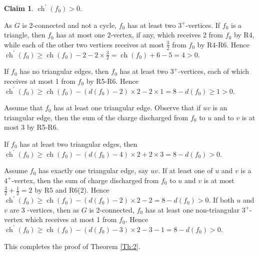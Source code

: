 \documentclass{article}
\newtheorem{claim}{Claim}
\begin{document}
\begin{claim}
    $\operatorname{ch}^{\prime}(f_0)>0$.
\end{claim}

As $G$ is 2-connected and not a cycle, $f_0$ has at least two $3^+$-vertices. If $f_0$ is a triangle, then $f_0$ has at most one $2$-vertex, if any, which receives 2 from $f_0$ by R4, while each of the other two vertices receives at most $\frac{3}{2}$ from $f_0$ by R4-R6. Hence  $\operatorname{ch}^{\prime}(f_0)\ge  \operatorname{ch}(f_0)-2 - 2\times\frac{3}{2}= \operatorname{ch}(f_0)+6 - 5 = 4>0$. 

 If $f_0$ has no triangular edges, then $f_0$ has at least two $3^+$-vertices, each of which receives at 
 most 1 from $f_0$ by R5-R6. Hence  $\operatorname{ch}^{\prime}(f_0)\ge  \operatorname{ch}(f_0)-(d(f_0)-2)\times 2 - 2\times 1=8 - d(f_0)\ge  1>0$. 
 
 Assume that $f_0$ has at least one triangular edge. Observe that if $uv$ is an triangular edge, then the sum of the charge discharged from $f_0$ to $u$ and to $v$ is at most 3 by R5-R6. 
 
 If $f_0$ has at least two triangular edges, then $\operatorname{ch}^{\prime}(f_0)\ge  \operatorname{ch}(f_0)-(d(f_0)-4 )\times 2+2\times 3=8 - d(f_0)>0$. 
 
 Assume $f_0$ has exactly one triangular edge, say $uv$. If at least one of $u$ and $v$ is a $4^+$-vertex, then the sum of charge discharged from $f_0$ to $u$ and $v$ is at most  $\frac{3}{2}+\frac{1}{2}=2$  by R5 and R6(2).
Hence $\operatorname{ch}^{\prime}\left(f_{0}\right) \geq \operatorname{ch}\left(f_{0}\right)-\left(d\left(f_{0}\right)-2\right) \times 2-2=8-d\left(f_{0}\right)>0 $. 
If both $u$ and $ v $ are 3 -vertices, then as $ G $ is 2-connected, $f_{0}$ has at least one non-triangular $3^{+}$-vertex which receives at most 1 from $f_{0} $. Hence $\operatorname{ch}^{\prime}\left(f_{0}\right) \geq \operatorname{ch}\left(f_{0}\right)-\left(d\left(f_{0}\right)-3\right) \times 2-3-1=8-d\left(f_{0}\right)>0$.

This completes the proof of Theorem \ref{Th:2}.



 
\end{document}
